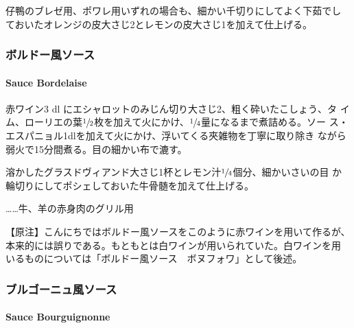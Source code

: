 仔鴨のブレゼ用、ポワレ用いずれの場合も、細かい千切りにしてよく下茹でし
ておいたオレンジの皮大さじ2とレモンの皮大さじ1を加えて仕上げる。

\maeaki

\hypertarget{ux30dcux30ebux30c9ux30fcux98a8ux30bdux30fcux30b9}{%
\subsubsection{ボルドー風ソース}\label{ux30dcux30ebux30c9ux30fcux98a8ux30bdux30fcux30b9}}

\hypertarget{sauce-bordelaise}{%
\paragraph{Sauce Bordelaise}\label{sauce-bordelaise}}


赤ワイン3 dl にエシャロットのみじん切り大さじ2、粗く砕いたこしょう、タ
イム、ローリエの葉\(\sfrac{1}{2}\)枚を加えて火にかけ、\(\sfrac{1}{4}\)量になるまで煮詰める。ソー
ス・エスパニョル1dlを加えて火にかけ、浮いてくる夾雑物を丁寧に取り除き
ながら弱火で15分間煮る。目の細かい布で漉す。

溶かしたグラスドヴィアンド大さじ1杯とレモン汁\(\sfrac{1}{4}\)個分、細かいさいの目
か輪切りにしてポシェしておいた牛骨髄を加えて仕上げる。

\ldots{}\ldots{}牛、羊の赤身肉のグリル用

【原注】こんにちではボルドー風ソースをこのように赤ワインを用いて作るが、
本来的には誤りである。もともとは白ワインが用いられていた。白ワインを用
いるものについては「ボルドー風ソース　ボヌフォワ」として後述。

\maeaki

\hypertarget{ux30d6ux30ebux30b4ux30fcux30cbux30e5ux98a8ux30bdux30fcux30b9}{%
\subsubsection{ブルゴーニュ風ソース}\label{ux30d6ux30ebux30b4ux30fcux30cbux30e5ux98a8ux30bdux30fcux30b9}}

\hypertarget{sauce-bourguignonne}{%
\paragraph{Sauce Bourguignonne}\label{sauce-bourguignonne}}

